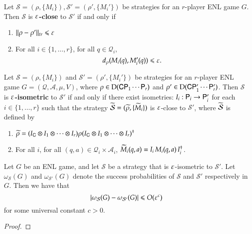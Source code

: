 \begin{definition}
	Let $\mathcal{S} = (\rho,\{M_i\}), \mathcal{S}' = (\rho',\{M_i'\})$ be strategies for an $r$-player ENL game $G$. Then $\mathcal{S}$ is \textbf{$\varepsilon$-close} to $\mathcal{S}'$ if and only if
	\begin{enumerate}
		\item $ \lVert \rho - \rho'\rVert_{tr} \leqslant \varepsilon$
		\item For all $i\in\{1,\ldots,r\}$, for all $q \in \mathcal{Q}_i$,
		\[
		d_\rho(M_i(q),M_i'(q)) \leqslant \varepsilon.
		\]
	\end{enumerate}
\end{definition}

\begin{definition}
	Let $\mathcal{S} = (\rho,\{M_i\})$ and $\mathcal{S}' = (\rho',\{M_i'\})$ be strategies for an $r$-player ENL game $G = (\mathcal{Q},\mathcal{A},\mu,V)$, where $\rho \in \mathrm{D}({\mathsf{C}} {\mathsf{P}}_1 \cdots {\mathsf{P}}_r)$ and $\rho' \in \mathrm{D}({\mathsf{C}} {\mathsf{P}}_1' \cdots {\mathsf{P}}_r')$. Then $\mathcal{S}$ is \textbf{$\varepsilon$-isometric} to $\mathcal{S}'$ if and only if there exist isometries: $I_i : {\mathsf{P}}_i \to {\mathsf{P}}_i'$ for each $i\in\{1,\ldots,r\}$ such that the strategy $\widetilde{\mathcal{S}} = (\widetilde{\rho}, \{ \widetilde{M}_i \})$ is $\varepsilon$-close to $\mathcal{S}'$, where $\widetilde{\mathcal{S}}$ is defined by
	\begin{enumerate}
		\item $\widetilde{\rho} = (I_{\mathsf{C}} \otimes I_1 \otimes \cdots \otimes I_r) \rho (I_{\mathsf{C}} \otimes I_1 \otimes \cdots \otimes I_r)^\dagger$
		\item For all $i$, for all $(q,a) \in \mathcal{Q}_i \times \mathcal{A}_i$, $\widetilde{M}_i(q,a) = I_i \, M_i(q,a)\, I_i^\dagger$.
	\end{enumerate}
\end{definition}


\begin{lemma}
\label{lem:close_strategies}
	Let $G$ be an ENL game, and let $\mathcal{S}$ be a strategy that is $\varepsilon$-isometric to $\mathcal{S}'$. Let $\omega_{\mathcal{S}}(G)$ and $\omega_{\mathcal{S}'}(G)$ denote the success probabilities of $\mathcal{S}$ and $\mathcal{S}'$ respectively in $G$. Then we have that
	\[
		\left\lvert \omega_{\mathcal{S}}(G) - \omega_{\mathcal{S}'}(G) \right\rvert \leqslant O(\varepsilon^c)
	\]
	for some universal constant $c > 0$.
\end{lemma}
\begin{proof}
\end{proof}

